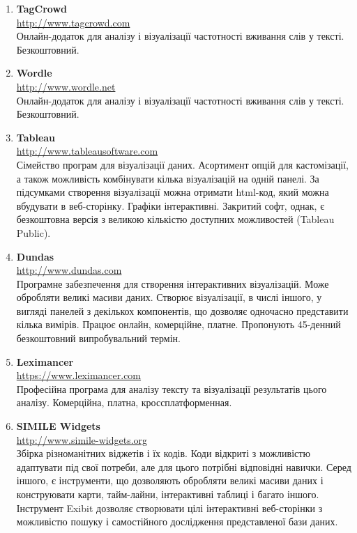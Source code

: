 \begin{enumerate}
    \item \textbf{TagCrowd} \\
    \url{http://www.tagcrowd.com} \\
    Онлайн-додаток для аналізу і візуалізації частотності вживання слів у тексті. Безкоштовний.

    \item \textbf{Wordle} \\
    \url{http://www.wordle.net} \\
    Онлайн-додаток для аналізу і візуалізації частотності вживання слів у тексті. Безкоштовний.

    \item \textbf{Tableau} \\
    \url{http://www.tableausoftware.com} \\
    Сімейство програм для візуалізації даних. Асортимент опцій для кастомізації, а також можливість комбінувати кілька візуалізацій на одній панелі. За підсумками створення візуалізації можна отримати html-код, який можна вбудувати в веб-сторінку. Графіки інтерактивні. Закритий софт, однак, є безкоштовна версія з великою кількістю доступних можливостей (Tableau Public).

    \item \textbf{Dundas} \\
    \url{http://www.dundas.com} \\
    Програмне забезпечення для створення інтерактивних візуалізацій. Може обробляти великі масиви даних. Створює візуалізації, в числі іншого, у вигляді панелей з декількох компонентів, що дозволяє одночасно представити кілька вимірів. Працює онлайн, комерційне, платне. Пропонують 45-денний безкоштовний випробувальний термін.

    \item \textbf{Leximancer} \\
    \url{https://www.leximancer.com} \\
    Професійна програма для аналізу тексту та візуалізації результатів цього аналізу. Комерційна, платна, кроссплатформенная.

    \item \textbf{SIMILE Widgets} \\
    \url{http://www.simile-widgets.org} \\
    Збірка різноманітних віджетів і їх кодів. Коди відкриті з можливістю адаптувати під свої потреби, але для цього потрібні відповідні навички. Серед іншого, є інструменти, що дозволяють обробляти великі масиви даних і конструювати карти, тайм-лайни, інтерактивні таблиці і багато іншого. Інструмент Exibit дозволяє створювати цілі інтерактивні веб-сторінки з можливістю пошуку і самостійного дослідження представленої бази даних.


\end{enumerate}
